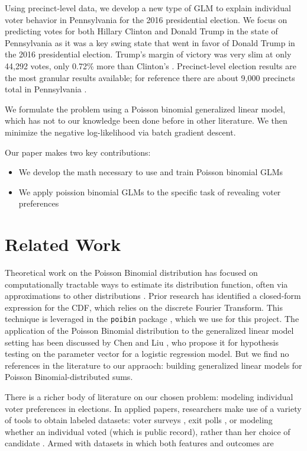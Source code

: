 \documentclass[10pt, letterpaper]{article}
\begin{document}
Using precinct-level data, we develop a new type of GLM to explain individual voter behavior in Pennsylvania for the 2016 presidential election. We focus on predicting votes for both Hillary Clinton and Donald Trump in the state of Pennsylvania as it was a key swing state that went in favor of Donald Trump in the 2016 presidential election. Trump's margin of victory was very slim at only 44,292 votes, only 0.72\% more than Clinton's \cite{NYT}. Precinct-level election results are the most granular results available; for reference there are about 9,000 precincts total in Pennsylvania \cite{NYT}. 

We formulate the problem using a Poisson binomial generalized linear model, which has not to our knowledge been done before in other literature. We then minimize the negative log-likelihood via batch gradient descent.

Our paper makes two key contributions:
\begin{itemize}[noitemsep]
	\item We develop the math necessary to use and train Poisson binomial GLMs
	\item We apply poission binomial GLMs to the specific task of revealing voter preferences
\end{itemize}

\section{Related Work}
Theoretical work on the Poisson Binomial distribution has focused on computationally tractable ways to estimate its distribution function, often via approximations to other distributions 
\cite{EHM19917, roos1999, chen1974}. Prior research \cite{HONG201341} has identified a closed-form expression for the CDF, which relies on the discrete Fourier Transform. This technique is leveraged in the \texttt{poibin} package \cite{PoibiGithub}, which we use for this project. The application of the Poisson Binomial distribution to the generalized linear model setting has been discussed by Chen and Liu \cite{Poibi}, who propose it for hypothesis testing on the parameter vector for a logistic regression model. But we find no references in the literature to our appraoch: building generalized linear models for Poisson Binomial-distributed sums. 

There is a richer body of literature on our chosen problem: modeling individual voter preferences in elections. In applied papers, researchers make use of a variety of tools to obtain labeled datasets: voter surveys \cite{dubrow2007choosing}, exit polls \cite{carsey1995contextual}, or modeling whether an individual voted (which is public record), rather than her choice of candidate \cite{rusch2013influencing}. Armed with datasets in which both features and outcomes are 
\end{document}
